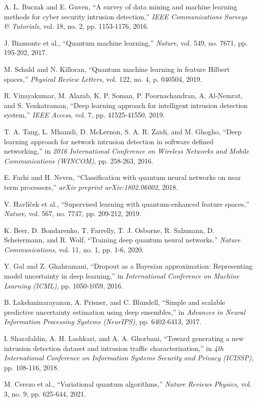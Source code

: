 \documentclass[conference]{IEEEtran}
\begin{document}
\begin{thebibliography}{00}
 A. L. Buczak and E. Guven, ``A survey of data mining and machine learning methods for cyber security intrusion detection,'' \textit{IEEE Communications Surveys \& Tutorials}, vol. 18, no. 2, pp. 1153-1176, 2016.

 J. Biamonte et al., ``Quantum machine learning,'' \textit{Nature}, vol. 549, no. 7671, pp. 195-202, 2017.

 M. Schuld and N. Killoran, ``Quantum machine learning in feature Hilbert spaces,'' \textit{Physical Review Letters}, vol. 122, no. 4, p. 040504, 2019.

 R. Vinayakumar, M. Alazab, K. P. Soman, P. Poornachandran, A. Al-Nemrat, and S. Venkatraman, ``Deep learning approach for intelligent intrusion detection system,'' \textit{IEEE Access}, vol. 7, pp. 41525-41550, 2019.

 T. A. Tang, L. Mhamdi, D. McLernon, S. A. R. Zaidi, and M. Ghogho, ``Deep learning approach for network intrusion detection in software defined networking,'' in \textit{2016 International Conference on Wireless Networks and Mobile Communications (WINCOM)}, pp. 258-263, 2016.

 E. Farhi and H. Neven, ``Classification with quantum neural networks on near term processors,'' \textit{arXiv preprint arXiv:1802.06002}, 2018.

 V. Havlíček et al., ``Supervised learning with quantum-enhanced feature spaces,'' \textit{Nature}, vol. 567, no. 7747, pp. 209-212, 2019.

 K. Beer, D. Bondarenko, T. Farrelly, T. J. Osborne, R. Salzmann, D. Scheiermann, and R. Wolf, ``Training deep quantum neural networks,'' \textit{Nature Communications}, vol. 11, no. 1, pp. 1-6, 2020.

 Y. Gal and Z. Ghahramani, ``Dropout as a Bayesian approximation: Representing model uncertainty in deep learning,'' in \textit{International Conference on Machine Learning (ICML)}, pp. 1050-1059, 2016.

 B. Lakshminarayanan, A. Prisner, and C. Blundell, ``Simple and scalable predictive uncertainty estimation using deep ensembles,'' in \textit{Advances in Neural Information Processing Systems (NeurIPS)}, pp. 6402-6413, 2017.

 I. Sharafaldin, A. H. Lashkari, and A. A. Ghorbani, ``Toward generating a new intrusion detection dataset and intrusion traffic characterization,'' in \textit{4th International Conference on Information Systems Security and Privacy (ICISSP)}, pp. 108-116, 2018.

 M. Cerezo et al., ``Variational quantum algorithms,'' \textit{Nature Reviews Physics}, vol. 3, no. 9, pp. 625-644, 2021.

\end{thebibliography}
\end{document}
